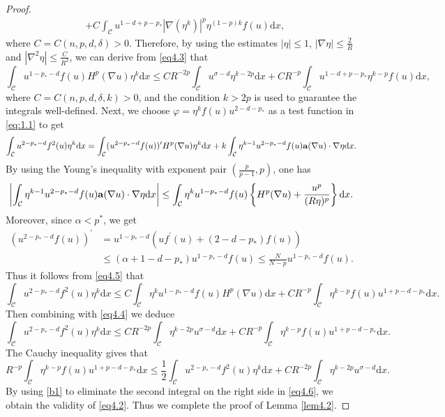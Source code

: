 \documentclass[12pt]{amsart}
\theoremstyle{definition}
\theoremstyle{remark}
\theoremstyle{conclusion}
\theoremstyle{conjecture}
\numberwithin{equation}{section}
\begin{document}
\begin{proof}
\begin{equation*}
\begin{aligned}
 &+ C\int_{\mathcal{C}}u^{1-d+p-p_*}|\nabla(\eta^k)|^{p}\eta^{(1-p)k}f(u)\mathrm{d}x,
  \end{aligned}
\end{equation*}
where $C=C(n,p,d,\delta)>0$. Therefore, by using the estimates $|\eta|\leq1$, $|\nabla\eta|\leq\frac{2}{R}$ and $|\nabla^2\eta|\leq\frac{C}{R^2}$, we can derive from \eqref{eq4.3} that
\begin{equation}\label{eq4.4}
 \int_{\mathcal{C}}u^{1-p_*-d}f(u)H^p(\nabla u)\eta^k\mathrm{d}x\leq CR^{-2p} \int_{\mathcal{C}}u^{\sigma-d}\eta^{k-2p}\mathrm{d}x+CR^{-p}\int_{\mathcal{C}}u^{1-d+p-p_*}\eta^{k-p}f(u)\mathrm{d}x,
\end{equation}
where $C=C(n,p,d,\delta,k)>0$, and the condition $k>2p$ is used to guarantee the integrals well-defined. Next, we choose $\varphi=\eta^kf(u)u^{2-d-p_*}$ as a test function in \eqref{eq:1.1} to get
\begin{equation}\label{eq4.5}
  \int_{\mathcal{C}}u^{2-p_*-d}f^2(u)\eta^k\mathrm{d}x=\int_{\mathcal{C}}(u^{2-p_*-d}f(u))^{\prime}H^p(\nabla u)\eta^k\mathrm{d}x+k\int_{\mathcal{C}}\eta^{k-1}u^{2-p_*-d}f(u){\bf{a}}(\nabla u)\cdot\nabla\eta\mathrm{d}x.
\end{equation}
By using the Young's inequality with exponent pair $(\frac{p}{p-1},p)$, one has
$$\left\lvert \int_{\mathcal{C}}\eta^{k-1}u^{2-p_*-d}f(u){\bf{a}}(\nabla u)\cdot\nabla\eta\mathrm{d}x\right\rvert\leq \int_{\mathcal{C}}\eta^{k}u^{1-p_*-d}f(u)\left\{H^p(\nabla u)+\frac{u^p}{(R\eta)^p}\right\} \mathrm{d}x. $$
Moreover, since $\alpha<p^*$, we get
\begin{equation*}
  \begin{aligned}
    (u^{2-p_*-d}f(u))^{\prime}&=u^{1-p_*-d}(uf^{\prime}(u)+(2-d-p_*)f(u))\\
    &\leq (\alpha+1-d-p_*)u^{1-p_*-d}f(u)\leq \frac{N}{N-p}u^{1-p_*-d}f(u).
  \end{aligned}
\end{equation*}
Thus it follows from \eqref{eq4.5} that
$$\int_{\mathcal{C}}u^{2-p_*-d}f^2(u)\eta^k\mathrm{d}x\leq C\int_{\mathcal{C}}\eta^{k}u^{1-p_*-d}f(u)H^p(\nabla u)\mathrm{d}x+CR^{-p}\int_{\mathcal{C}}\eta^{k-p}f(u)u^{1+p-d-p_*}\mathrm{d}x.$$
Then combining with \eqref{eq4.4} we deduce
\begin{equation}\label{eq4.6}
 \int_{\mathcal{C}}u^{2-p_*-d}f^2(u)\eta^k\mathrm{d}x\leq CR^{-2p}\int_{\mathcal{C}}\eta^{k-2p}u^{\sigma-d}\mathrm{d}x+CR^{-p}\int_{\mathcal{C}}\eta^{k-p}f(u)u^{1+p-d-p_*}\mathrm{d}x.
\end{equation}
The Cauchy inequality gives that
\begin{equation}\label{b1}
  R^{-p}\int_{\mathcal{C}}\eta^{k-p}f(u)u^{1+p-d-p_*}\mathrm{d}x\leq\frac{1}{2} \int_{\mathcal{C}}u^{2-p_*-d}f^2(u)\eta^k\mathrm{d}x+CR^{-2p}\int_{\mathcal{C}}\eta^{k-2p}u^{\sigma-d}\mathrm{d}x.
\end{equation}
By using \eqref{b1} to eliminate the second integral on the right side in \eqref{eq4.6}, we obtain the validity of \eqref{eq4.2}. Thus we complete the proof of Lemma \ref{lem4.2}.
\end{proof}
\end{document}

